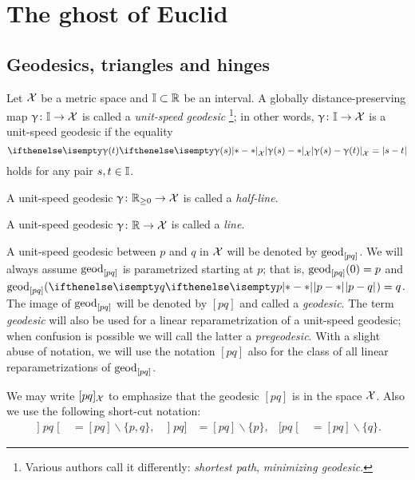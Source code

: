 \chapter{The ghost of Euclid}

\section{Geodesics, triangles and hinges}
\label{sec:geods}

Let $\mathcal{X}$ be a metric space and $\II\subset \R$\index{$\II$} be an interval. 
A globally distance-preserving map $\gamma\:\II\to \spc{X}$ is called a \emph{unit-speed geodesic}%
\footnote{Various authors call it differently: \emph{shortest path}, \emph{minimizing geodesic}.}; 
in other words, $\gamma\:\II\to \spc{X}$ is a unit-speed geodesic if the equality
\[\dist{\gamma(s)}{\gamma(t)}{\spc{X}}=|s-t|\]
holds for any pair $s,t\in \II$.

A unit-speed geodesic $\gamma\:\RR_{\ge0}\to \spc{X}$ is called a \emph{half-line}.

A unit-speed geodesic  $\gamma\:\RR\to \spc{X}$ is called a \emph{line}.

A unit-speed geodesic between $p$ and $q$ in $\mathcal{X}$ will be denoted by $\mathrm{geod}_{[p q]}$\index{$\geod_{[{p}{q}]}$}.
We will always assume $\mathrm{geod}_{[p q]}$ is parametrized starting at $p$; 
that is, $\mathrm{geod}_{[p q]}(0)=p$ and $\geod_{[p q]}(\dist{p}{q}{})=q$.
The image of $\mathrm{geod}_{[p q]}$ will be denoted by $[p q]$\index{$[{p}{q}]$} and called a \emph{geodesic}.
The term \emph{geodesic} will also be used for  a linear reparametrization of a unit-speed geodesic;
when confusion is possible we will call the latter a \emph{pregeodesic}.
With a slight abuse of notation, we will use the notation $[p q]$ also for the class of all linear reparametrizations of $\mathrm{geod}_{[p q]}$.

We may write $[p q]_{\mathcal{X}}$ 
to emphasize that the geodesic $[p q]$ is in the space  ${\mathcal{X}}$.
Also we use the following short-cut notation:
\begin{align*}
\mathopen{]} p q \mathclose{[}&=[pq]\backslash\{p,q\},
&
\mathopen{]} p q ]&=[pq]\backslash\{p\},
&
[ p q \mathclose{[}&=[pq]\backslash\{q\}.
\end{align*}



